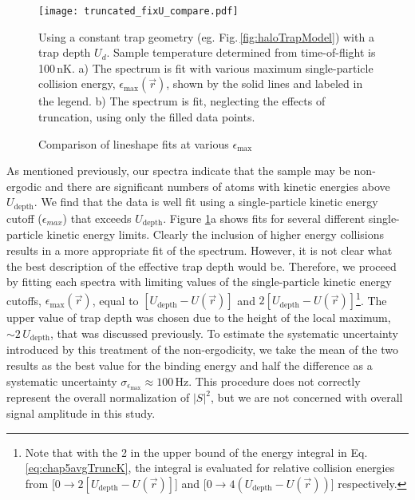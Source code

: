 	\begin{figure}
	\centerline{
	  \texttt{[image: truncated\_fixU\_compare.pdf]}}
	  \caption{Comparison of lineshape fits at various $\epsilon_{\text{max}}$}{Using a constant trap geometry (eg. Fig.\,\ref{fig:haloTrapModel}) with a trap depth $U_d$. Sample temperature determined from time-of-flight is 100\,nK. a) The spectrum is fit with various maximum single-particle collision energy, $\epsilon_{\text{max}}(\vec{r})$, shown by the solid lines and labeled in the legend. b) The spectrum is fit, neglecting the effects of truncation, using only the filled data points.}
	  \label{fig:truncatedSpectraFit}
	\end{figure}
As mentioned previously, our spectra indicate that the sample may be non-ergodic and there are significant numbers of atoms with kinetic energies above $U_\text{depth}$. 
We find that the data is well fit using a single-particle kinetic energy cutoff ($\epsilon_{max}$) that exceeds $U_\text{depth}$. 
Figure \ref{fig:truncatedSpectraFit}a shows fits for several different single-particle kinetic energy limits. 
Clearly the inclusion of higher energy collisions results in a more appropriate fit of the spectrum.
However, it is not clear what the best description of the effective trap depth would be.
Therefore, we proceed by fitting each spectra with limiting values of the single-particle kinetic energy cutoffs, $\epsilon_{\text{max}}(\vec{r})$, equal to $[U_{\text{depth}}-U(\vec{r})]$ and $2[U_{\text{depth}}-U(\vec{r})]$\footnote{Note that with the 2 in the upper bound of the energy integral in Eq.\,\ref{eq:chap5avgTruncK}, the integral is evaluated for relative collision energies from $[0 \rightarrow 2[U_{\text{depth}}-U(\vec{r})]$] and $[0 \rightarrow 4(U_{\text{depth}}-U(\vec{r}))$] respectively.}.
The upper value of trap depth was chosen due to the height of the local maximum, $\sim\!2\,U_\text{depth}$, that was discussed previously.
To estimate the systematic uncertainty introduced by this treatment of the non-ergodicity, we take the mean of the two results as the best value for the binding energy and half the difference as a systematic uncertainty $\sigma_{\epsilon_{\text{max}}}\approx 100$\,Hz.
This procedure does not correctly represent the overall normalization of $\vert S \vert^2$, but we are not concerned with overall signal amplitude in this study.


